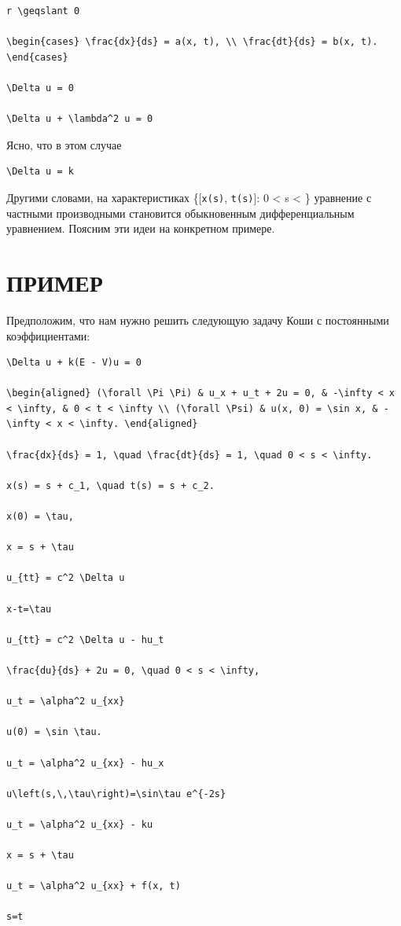 \documentclass[
  ukrainian,
]{article}
\begin{document}
\begin{verbatim}
r \geqslant 0

\begin{cases} \frac{dx}{ds} = a(x, t), \\ \frac{dt}{ds} = b(x, t). \end{cases}

\Delta u = 0

\Delta u + \lambda^2 u = 0
\end{verbatim}

Ясно, что в этом случае

\begin{verbatim}
\Delta u = k
\end{verbatim}

Другими словами, на характеристиках \{{[}\texttt{x(s)},
\texttt{t(s)}{]}: 0 \textless{} s \textless{} \infty\} уравнение с
частными производными становится обыкновенным дифференциальным
уравнением. Поясним эти идеи на конкретном примере.

\section{ПРИМЕР}\label{ux43fux440ux438ux43cux435ux440}

Предположим, что нам нужно решить следующую задачу Коши с постоянными
коэффициентами:

\begin{verbatim}
\Delta u + k(E - V)u = 0

\begin{aligned} (\forall \Pi \Pi) & u_x + u_t + 2u = 0, & -\infty < x < \infty, & 0 < t < \infty \\ (\forall \Psi) & u(x, 0) = \sin x, & -\infty < x < \infty. \end{aligned}

\frac{dx}{ds} = 1, \quad \frac{dt}{ds} = 1, \quad 0 < s < \infty.

x(s) = s + c_1, \quad t(s) = s + c_2.

x(0) = \tau,

x = s + \tau

u_{tt} = c^2 \Delta u

x-t=\tau

u_{tt} = c^2 \Delta u - hu_t

\frac{du}{ds} + 2u = 0, \quad 0 < s < \infty,

u_t = \alpha^2 u_{xx}

u(0) = \sin \tau.

u_t = \alpha^2 u_{xx} - hu_x

u\left(s,\,\tau\right)=\sin\tau e^{-2s}

u_t = \alpha^2 u_{xx} - ku

x = s + \tau

u_t = \alpha^2 u_{xx} + f(x, t)

s=t
\end{verbatim}
\end{document}
